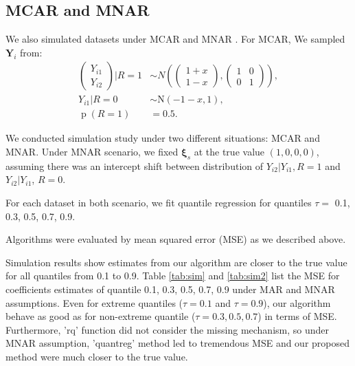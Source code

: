 \documentclass[12pt]{article}
\DeclareMathOperator{\pr}{p}
\begin{document}
\subsection{MCAR and MNAR}

We also simulated datasets under MCAR and MNAR . For MCAR, We sampled
$\bm Y_i$ from:
\begin{align*}
  \begin{pmatrix}
    Y_{i1}\\
    Y_{i2}
  \end{pmatrix}
  \Big |R = 1 & \sim N \left(
    \begin{pmatrix}
      1 + x\\
      1 - x
    \end{pmatrix},
    \begin{pmatrix}
      1& 0 \\
      0 & 1
    \end{pmatrix} \right), \\
  Y_{i1} | R = 0 & \sim \textrm{N}(-1-x, 1) , \\
  \pr (R = 1) & = 0.5.
\end{align*}

We conducted simulation study under two different situations: MCAR and
MNAR.  Under MNAR scenario, we fixed $\bm \xi_s$ at the true value
$(1, 0, 0, 0)$, assuming there was an intercept shift between
distribution of $Y_{i2}|Y_{i1}, R = 1$ and $Y_{i2}|Y_{i1}$, $R = 0$.

For each dataset in both scenario, we fit quantile regression for
quantiles $\tau =$ 0.1, 0.3, 0.5, 0.7, 0.9.

Algorithms were evaluated by mean squared error (MSE) as we described
above.

Simulation results show estimates from our algorithm are closer to the
true value for all quantiles from 0.1 to 0.9. Table \ref{tab:sim} and
\ref{tab:sim2} list the MSE for coefficients estimates of quantile
0.1, 0.3, 0.5, 0.7, 0.9 under MAR and MNAR assumptions. Even for
extreme quantiles ($\tau = 0.1$ and $\tau = 0.9$), our algorithm
behave as good as for non-extreme quantile ($\tau = 0.3, 0.5, 0.7$) in
terms of MSE. Furthermore, 'rq' function did not consider the missing
mechanism, so under MNAR assumption, 'quantreg' method led to
tremendous MSE and our proposed method were much closer to the true
value.
\end{document}
